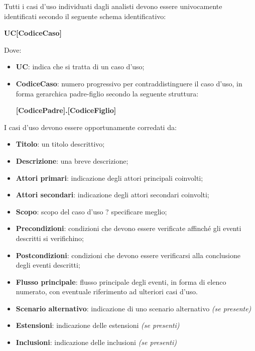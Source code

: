 Tutti i casi d'uso individuati dagli analisti devono essere univocamente identificati secondo il seguente schema identificativo:

\begin{center}
    \textbf{UC[CodiceCaso]}
\end{center}

Dove:

\begin{itemize}
    \item \textbf{UC}: indica che si tratta di un caso d'uso;
    \item \textbf{CodiceCaso}: numero progressivo per contraddistinguere il caso d'uso, in forma gerarchica padre-figlio secondo la seguente struttura:
    \begin{center}
        \textbf{[CodicePadre].[CodiceFiglio]}
    \end{center}
\end{itemize}

I casi d'uso devono essere opportunamente corredati da:

\begin{itemize}
    \item \textbf{Titolo}: un titolo descrittivo;
    \item \textbf{Descrizione}: una breve descrizione;
    \item \textbf{Attori primari}: indicazione degli attori principali coinvolti;
    \item \textbf{Attori secondari}: indicazione degli attori secondari coinvolti;
    \item \textbf{Scopo}: scopo del caso d'uso ? specificare meglio;
    \item \textbf{Precondizioni}: condizioni che devono essere verificate affinch\'{e} gli eventi descritti si verifichino;
    \item \textbf{Postcondizioni}: condizioni che devono essere verificarsi alla conclusione degli eventi descritti; 
    \item \textbf{Flusso principale}: flusso principale degli eventi, in forma di elenco numerato, con eventuale riferimento ad ulteriori casi d'uso.
    \item \textbf{Scenario alternativo}: indicazione di uno scenario alternativo \emph{(se presente)}
    \item \textbf{Estensioni}: indicazione delle estensioni \emph{(se presenti)}
    \item \textbf{Inclusioni}: indicazione delle inclusioni \emph{(se presenti)} 
\end{itemize}
